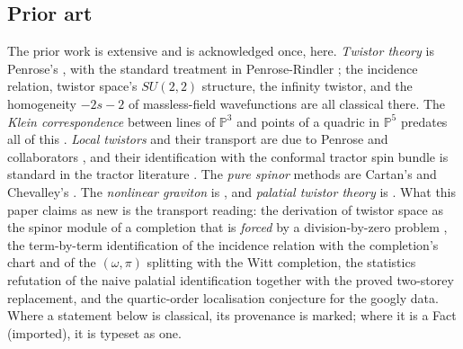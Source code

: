 \documentclass[11pt]{article}
\theoremstyle{definition}
\theoremstyle{plain}
\begin{document}
\subsection*{Prior art}
\label{c:note.correspondence.setting-prior-art}
The prior work is extensive and is acknowledged once, here. \emph{Twistor theory} is Penrose's \cite{Penrose1967}, with the standard treatment in Penrose-Rindler \cite{PenroseRindler86}; the incidence relation, twistor space's $SU(2,2)$ structure, the infinity twistor, and the homogeneity $-2s-2$ of massless-field wavefunctions are all classical there. The \emph{Klein correspondence} between lines of $\mathbb{P}^3$ and points of a quadric in $\mathbb{P}^5$ predates all of this \cite{Klein1870}. \emph{Local twistors} and their transport are due to Penrose and collaborators \cite{PenroseMacCallum73, Dighton74}, and their identification with the conformal tractor spin bundle is standard in the tractor literature \cite{BEG1994, CurryGover2018}. The \emph{pure spinor} methods are Cartan's and Chevalley's \cite{Chevalley54}. The \emph{nonlinear graviton} is \cite{Penrose76}, and \emph{palatial twistor theory} is \cite{Penrose15}. What this paper claims as new is the transport reading: the derivation of twistor space as the spinor module of a completion that is \emph{forced} by a division-by-zero problem \cite{ButlerT1}, the term-by-term identification of the incidence relation with the completion's chart and of the $(\omega, \pi)$ splitting with the Witt completion, the statistics refutation of the naive palatial identification together with the proved two-storey replacement, and the quartic-order localisation conjecture for the googly data. Where a statement below is classical, its provenance is marked; where it is a Fact (imported), it is typeset as one.
\end{document}
